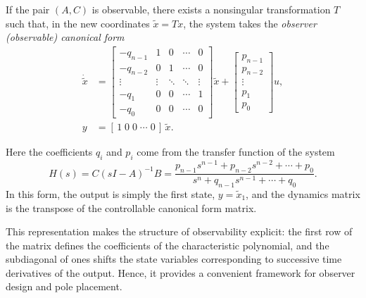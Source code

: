 \begin{theorem}
If the pair $(A,C)$ is observable, there exists a nonsingular transformation 
$T$ such that, in the new coordinates $\tilde{x} = T x$, 
the system takes the \emph{observer (observable) canonical form}
\begin{align}
    \dot{\tilde{x}} &=
    \begin{bmatrix}
        -q_{n-1} & 1         & 0         & \cdots & 0\\
        -q_{n-2} & 0         & 1         & \cdots & 0\\
        \vdots   & \vdots    & \ddots    & \ddots & \vdots\\
        -q_{1}   & 0         & 0         & \cdots & 1\\
        -q_{0}   & 0         & 0         & \cdots & 0
    \end{bmatrix} \tilde{x}
    +
    \begin{bmatrix}
        p_{n-1}\\ p_{n-2}\\ \vdots\\ p_{1}\\ p_{0}
    \end{bmatrix} u, \label{eq:obs_canonical}\\
    y &= [\,1 \; 0 \; 0 \; \cdots \; 0\,]\,\tilde{x}. \label{eq:obs_output}
\end{align}
\end{theorem}

Here the coefficients $q_i$ and $p_i$ come from the transfer function of the system
\begin{equation}
H(s) = C (sI - A)^{-1} B 
     = \frac{p_{n-1}s^{n-1} + p_{n-2}s^{n-2} + \cdots + p_0}
            {s^{n} + q_{n-1}s^{n-1} + \cdots + q_0}.
\end{equation}
In this form, the output is simply the first state, $y = \tilde{x}_1$, 
and the dynamics matrix is the transpose of the controllable canonical form matrix.

\begin{remark}
This representation makes the structure of observability explicit: 
the first row of the matrix defines the coefficients of the characteristic polynomial,
and the subdiagonal of ones shifts the state variables corresponding to 
successive time derivatives of the output.  
Hence, it provides a convenient framework for observer design and pole placement.
\end{remark}

